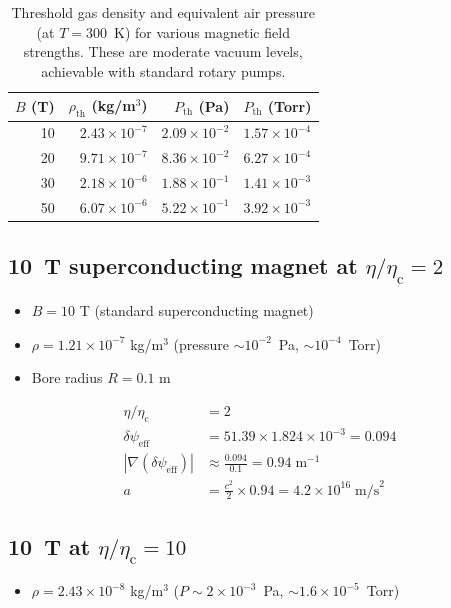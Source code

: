 \documentclass[12pt,a4paper]{article}
\newcommand{\psieff}{\psi_{\mathrm{eff}}}
\newcommand{\etac}{\eta_{\mathrm{c}}}
\begin{document}
\begin{table}[H]
\centering
\begin{tabular}{rrrl}
\toprule
$B$ (T) & $\rho_{\mathrm{th}}$ (kg/m$^3$) & $P_{\mathrm{th}}$ (Pa) & $P_{\mathrm{th}}$ (Torr) \\
\midrule
10  & $2.43 \times 10^{-7}$ & $2.09 \times 10^{-2}$ & $1.57 \times 10^{-4}$ \\
20  & $9.71 \times 10^{-7}$ & $8.36 \times 10^{-2}$ & $6.27 \times 10^{-4}$ \\
30  & $2.18 \times 10^{-6}$ & $1.88 \times 10^{-1}$ & $1.41 \times 10^{-3}$ \\
50  & $6.07 \times 10^{-6}$ & $5.22 \times 10^{-1}$ & $3.92 \times 10^{-3}$ \\
\bottomrule
\end{tabular}
\caption{Threshold gas density and equivalent air pressure (at $T = 300$~K) for various magnetic field strengths.
These are moderate vacuum levels, achievable with standard rotary pumps.}
\label{tab:thresholds}
\end{table}

\subsection{10~T superconducting magnet at $\eta/\etac = 2$}

\begin{itemize}
\item $B = 10$ T (standard superconducting magnet)
\item $\rho = 1.21 \times 10^{-7}$ kg/m$^3$ (pressure $\sim 10^{-2}$~Pa, $\sim 10^{-4}$~Torr)
\item Bore radius $R = 0.1$ m
\end{itemize}

\begin{align}
\eta/\etac &= 2 \\
\delta\psieff &= 51.39 \times 1.824 \times 10^{-3} = 0.094 \\
|\nabla(\delta\psieff)| &\approx \frac{0.094}{0.1} = 0.94 \;\text{m}^{-1} \\
a &= \frac{c^2}{2} \times 0.94 = 4.2 \times 10^{16} \;\text{m/s}^2
\end{align}

\subsection{10~T at $\eta/\etac = 10$}

\begin{itemize}
\item $\rho = 2.43 \times 10^{-8}$ kg/m$^3$ ($P \sim 2 \times 10^{-3}$~Pa, $\sim 1.6 \times 10^{-5}$~Torr)
\end{itemize}
\end{document}
